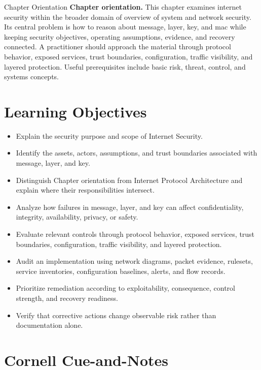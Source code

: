 \documentclass[11pt,letterpaper]{article}
\title{\CornellDocumentTitle}
\author{}
\date{}
\begin{document}
\maketitle
\begin{CornellOverviewBox}{Chapter Orientation}
\textbf{Chapter orientation.} This chapter examines internet security within the broader domain of overview of system and network security. Its central problem is how to reason about message, layer, key, and mac while keeping security objectives, operating assumptions, evidence, and recovery connected. A practitioner should approach the material through protocol behavior, exposed services, trust boundaries, configuration, traffic visibility, and layered protection. Useful prerequisites include basic risk, threat, control, and systems concepts.
\end{CornellOverviewBox}
\section*{Learning Objectives}
\begin{itemize}
\item Explain the security purpose and scope of Internet Security.
\item Identify the assets, actors, assumptions, and trust boundaries associated with message, layer, and key.
\item Distinguish Chapter orientation from Internet Protocol Architecture and explain where their responsibilities intersect.
\item Analyze how failures in message, layer, and key can affect confidentiality, integrity, availability, privacy, or safety.
\item Evaluate relevant controls through protocol behavior, exposed services, trust boundaries, configuration, traffic visibility, and layered protection.
\item Audit an implementation using network diagrams, packet evidence, rulesets, service inventories, configuration baselines, alerts, and flow records.
\item Prioritize remediation according to exploitability, consequence, control strength, and recovery readiness.
\item Verify that corrective actions change observable risk rather than documentation alone.
\end{itemize}
\section*{Cornell Cue-and-Notes}
\end{document}
